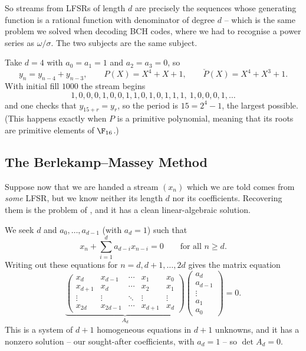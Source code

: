 So streams from LFSRs of length $d$ are precisely the sequences whose generating function is a rational function with denominator of degree $d$ -- which is the same problem we solved when decoding BCH codes, where we had to recognise a power series as $\omega/\sigma$. The two subjects are the same subject.

\begin{example}\label{ex:lfsr}
	Take $d = 4$ with $a_0 = a_1 = 1$ and $a_2=a_3=0$, so
	$$y_n = y_{n-4}+y_{n-3}, \qquad P(X) = X^4+X+1, \qquad \check P(X) = X^4+X^3+1.$$
	With initial fill $1000$ the stream begins
	$$1,0,0,0,1,0,0,1,1,0,1,0,1,1,1,\ 1,0,0,0,1,\dots$$
	and one checks that $y_{15+r} = y_r$, so the period is $15 = 2^4-1$, the largest possible. (This happens exactly when $P$ is a primitive polynomial, meaning that its roots are primitive elements of $\F_{16}$.)
\end{example}

\subsection{The Berlekamp--Massey Method}

Suppose now that we are handed a stream $(x_n)$ which we are told comes from \emph{some} LFSR, but we know neither its length $d$ nor its coefficients. Recovering them is the problem of , and it has a clean linear-algebraic solution.

We seek $d$ and $a_0,\dots,a_{d-1}$ (with $a_d = 1$) such that
$$x_n + \sum_{i=1}^{d}a_{d-i}x_{n-i} = 0 \qquad \text{for all } n \ge d.$$
Writing out these equations for $n = d, d+1, \dots, 2d$ gives the matrix equation
$$\underbrace{\begin{pmatrix}
	x_d & x_{d-1} & \cdots & x_1 & x_0\\
	x_{d+1} & x_d & \cdots & x_2 & x_1\\
	\vdots & \vdots & \ddots & \vdots & \vdots\\
	x_{2d} & x_{2d-1} & \cdots & x_{d+1} & x_d
\end{pmatrix}}_{A_d}
\begin{pmatrix} a_d\\ a_{d-1}\\ \vdots \\ a_1 \\ a_0\end{pmatrix} = 0.$$
This is a system of $d+1$ homogeneous equations in $d+1$ unknowns, and it has a nonzero solution -- our sought-after coefficients, with $a_d = 1$ -- so $\det A_d = 0$.


